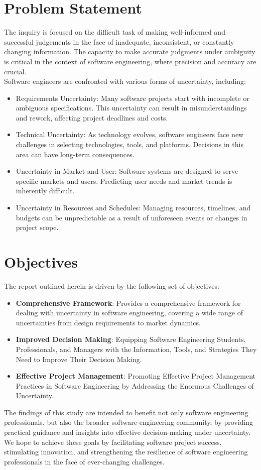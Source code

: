 \documentclass[a4paper,12pt]{report}
\begin{document}
\section{Problem Statement}
The inquiry is focused on the difficult task of making well-informed and successful judgements in the face of inadequate, inconsistent, or constantly changing information. The capacity to make accurate judgments under ambiguity is critical in the context of software engineering, where precision and accuracy are crucial.
\\
Software engineers are confronted with various forms of uncertainty, including:
\begin{itemize}
    \item Requirements Uncertainty: Many software projects start with incomplete or ambiguous specifications. This uncertainty can result in misunderstandings and rework, affecting project deadlines and costs.
    \item Technical Uncertainty: As technology evolves, software engineers face new challenges in selecting technologies, tools, and platforms. Decisions in this area can have long-term consequences.
    \item Uncertainty in Market and User: Software systems are designed to serve specific markets and users. Predicting user needs and market trends is inherently difficult.
    \item Uncertainty in Resources and Schedules: Managing resources, timelines, and budgets can be unpredictable as a result of unforeseen events or changes in project scope.

\end{itemize}
\section{Objectives}
The report outlined herein is driven by the following set of objectives:
\begin{itemize}
    \item \textbf{Comprehensive Framework}: Provides a comprehensive framework for dealing with uncertainty in software engineering, covering a wide range of uncertainties from design requirements to market dynamics.
    \item \textbf{Improved Decision Making}: Equipping Software Engineering Students, Professionals, and Managers with the Information, Tools, and Strategies They Need to Improve Their Decision Making.
    \item \textbf{Effective Project Management}: Promoting Effective Project Management Practices in Software Engineering by Addressing the Enormous Challenges of Uncertainty.
\end{itemize}
The findings of this study are intended to benefit not only software engineering professionals, but also the broader software engineering community, by providing practical guidance and insights into effective decision-making under uncertainty. We hope to achieve these goals by facilitating software project success, stimulating innovation, and strengthening the resilience of software engineering professionals in the face of ever-changing challenges.
\end{document}
